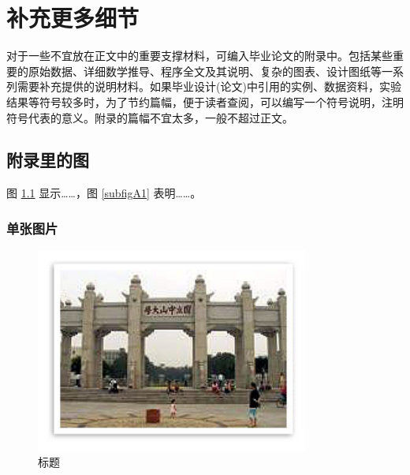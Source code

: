 \chapter{补充更多细节}
对于一些不宜放在正文中的重要支撑材料，可编入毕业论文的附录中。包括某些重要的原始数据、详细数学推导、程序全文及其说明、复杂的图表、设计图纸等一系列需要补充提供的说明材料。如果毕业设计(论文)中引用的实例、数据资料，实验结果等符号较多时，为了节约篇幅，便于读者查阅，可以编写一个符号说明，注明符号代表的意义。附录的篇幅不宜太多，一般不超过正文。

\section{附录里的图}

图 \ref{figA1} 显示……，图 \ref{subfigA1} 表明……。

\subsection{单张图片}
\begin{figure}[h]
	\centering
	\includegraphics[width=0.8\textwidth]{figure/fig1.png}
	\caption{标题} 
	\label{figA1}
\end{figure}


